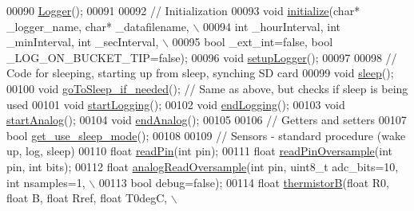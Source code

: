 \begin{DoxyCode}
00090     \hyperlink{classLogger_abc41bfb031d896170c7675fa96a6b30c}{Logger}();
00091     
00092     \textcolor{comment}{// Initialization}
00093     \textcolor{keywordtype}{void} \hyperlink{classLogger_a635c5dc0046646bec7023ef7133f0eb3}{initialize}(\textcolor{keywordtype}{char}* \_logger\_name, \textcolor{keywordtype}{char}* \_datafilename, \(\backslash\)
00094          \textcolor{keywordtype}{int} \_hourInterval, \textcolor{keywordtype}{int} \_minInterval, \textcolor{keywordtype}{int} \_secInterval, \(\backslash\)
00095          \textcolor{keywordtype}{bool} \_ext\_int=\textcolor{keyword}{false}, \textcolor{keywordtype}{bool} \_LOG\_ON\_BUCKET\_TIP=\textcolor{keyword}{false});
00096     \textcolor{keywordtype}{void} \hyperlink{classLogger_ab5e0bd543758c65a17b77553a0e9f0c9}{setupLogger}();
00097     
00098     \textcolor{comment}{// Code for sleeping, starting up from sleep, synching SD card}
00099     \textcolor{keywordtype}{void} \hyperlink{classLogger_ad90ff8f29410f6b70cc6334391400a4e}{sleep}();
00100     \textcolor{keywordtype}{void} \hyperlink{classLogger_ad28cf6450ada04f0e1475998bede5b88}{goToSleep\_if\_needed}(); \textcolor{comment}{// Same as above, but checks if sleep is being used}
00101     \textcolor{keywordtype}{void} \hyperlink{classLogger_a4a6c78dd1715b33ae4bbd6f66f116f77}{startLogging}();
00102     \textcolor{keywordtype}{void} \hyperlink{classLogger_aa82814d61687debcf3b8dd6f46c9d549}{endLogging}();
00103     \textcolor{keywordtype}{void} \hyperlink{classLogger_af936c7f58e23316abb5614cbd31c7ced}{startAnalog}();
00104     \textcolor{keywordtype}{void} \hyperlink{classLogger_adca7be8a63592263c67f63766680d16f}{endAnalog}();
00105     
00106     \textcolor{comment}{// Getters and setters}
00107     \textcolor{keywordtype}{bool} \hyperlink{classLogger_acc758b6fdaac8099c492929aa7f1691d}{get\_use\_sleep\_mode}();
00108     
00109     \textcolor{comment}{// Sensors - standard procedure (wake up, log, sleep)}
00110     \textcolor{keywordtype}{float} \hyperlink{classLogger_a343fcabefb37e06429865a2e6a6e708a}{readPin}(\textcolor{keywordtype}{int} pin);
00111     \textcolor{keywordtype}{float} \hyperlink{classLogger_a4e67526c65fa865f276a515a200af4aa}{readPinOversample}(\textcolor{keywordtype}{int} pin, \textcolor{keywordtype}{int} bits);
00112     \textcolor{keywordtype}{float} \hyperlink{classLogger_ad8296890a14a0df83c2433a20f25b899}{analogReadOversample}(\textcolor{keywordtype}{int} pin, uint8\_t adc\_bits=10, \textcolor{keywordtype}{int} nsamples=1, \(\backslash\)
00113           \textcolor{keywordtype}{bool} debug=\textcolor{keyword}{false});
00114     \textcolor{keywordtype}{float} \hyperlink{classLogger_a55d923b98a6c503fccb25bfd4af32f3d}{thermistorB}(\textcolor{keywordtype}{float} R0, \textcolor{keywordtype}{float} B, \textcolor{keywordtype}{float} Rref, \textcolor{keywordtype}{float} T0degC, \(\backslash\)

\end{DoxyCode}
